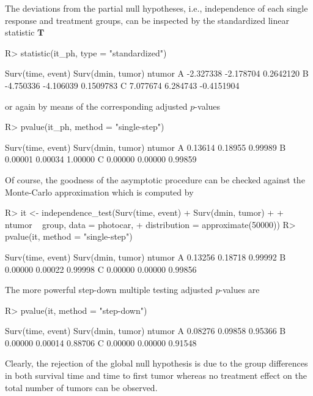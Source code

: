 \documentclass{article}
\newcommand{\T}{\mathbf{T}}
\newenvironment{Schunk}{}{}
\begin{document}
The deviations from the partial null hypotheses, i.e., independence of
each single response and treatment groups, can be inspected by the standardized
linear statistic $\T$
\begin{Schunk}
\begin{Sinput}
R> statistic(it_ph, type = "standardized")
\end{Sinput}
\begin{Soutput}
  Surv(time, event) Surv(dmin, tumor)     ntumor
A         -2.327338         -2.178704  0.2642120
B         -4.750336         -4.106039  0.1509783
C          7.077674          6.284743 -0.4151904
\end{Soutput}
\end{Schunk}
or again by means of the corresponding adjusted $p$-values
\begin{Schunk}
\begin{Sinput}
R> pvalue(it_ph, method = "single-step")
\end{Sinput}
\end{Schunk}
\begin{Schunk}
\begin{Soutput}
  Surv(time, event) Surv(dmin, tumor)  ntumor
A           0.13614           0.18955 0.99989
B           0.00001           0.00034 1.00000
C           0.00000           0.00000 0.99859
\end{Soutput}
\end{Schunk}
Of course, the goodness of the asymptotic procedure can be checked against
the Monte-Carlo approximation which is computed by
\begin{Schunk}
\begin{Sinput}
R> it <- independence_test(Surv(time, event) + Surv(dmin, tumor) +
+     ntumor ~ group, data = photocar, 
+     distribution = approximate(50000))
R> pvalue(it, method = "single-step")
\end{Sinput}
\begin{Soutput}
  Surv(time, event) Surv(dmin, tumor)  ntumor
A           0.13256           0.18718 0.99992
B           0.00000           0.00022 0.99998
C           0.00000           0.00000 0.99856
\end{Soutput}
\end{Schunk}
The more powerful step-down multiple testing adjusted $p$-values 
\citep[Algorithm 2.8 in][]{WestfallYoung1993} are 
\begin{Schunk}
\begin{Sinput}
R> pvalue(it, method = "step-down")
\end{Sinput}
\begin{Soutput}
  Surv(time, event) Surv(dmin, tumor)  ntumor
A           0.08276           0.09858 0.95366
B           0.00000           0.00014 0.88706
C           0.00000           0.00000 0.91548
\end{Soutput}
\end{Schunk}
Clearly, the rejection of the global null hypothesis is due to the
group differences in both survival time and time to first tumor whereas 
no treatment effect on the total number of tumors can be observed.
\end{document}
